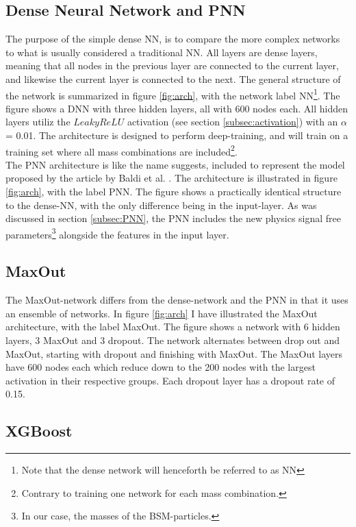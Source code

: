 \subsection*{Dense Neural Network and PNN}\label{subsec:PNNArch}
The purpose of the simple dense \ac{NN}, is to compare the more complex networks to what is usually considered a traditional \ac{NN}.
All layers are dense layers, meaning that all nodes in the previous layer are connected to the current layer, and likewise
the current layer is connected to the next. The general structure of the network is summarized in figure \ref{fig:arch}, with 
the network label \ac{NN}\footnote{Note that the dense network will henceforth be referred to as \ac{NN}}. The figure shows a \ac{DNN} with 
three hidden layers, all with 600 nodes each. All hidden layers utiliz the $LeakyReLU$ activation (see section \ref{subsec:activation})
with an $\alpha$ = 0.01. The architecture is designed to perform deep-training, and will train on a training set where all mass combinations 
are included\footnote{Contrary to training one network for each mass combination.}. 
\\
The \ac{PNN} architecture is like the name suggests, included to represent the model proposed by the article by Baldi et al. \cite{PNN}.
The architecture is illustrated in figure \ref{fig:arch}, with the label PNN. The figure shows a practically identical 
structure to the dense-\ac{NN}, with the only difference being in the input-layer. As was discussed in section \ref{subsec:PNN},
the \ac{PNN} includes the new physics signal free parameters\footnote{In our case, the masses of the \ac{BSM}-particles.} alongside the features
in the input layer.
\subsection*{MaxOut}
The MaxOut-network differs from the dense-network and the \ac{PNN} in that it uses an ensemble of networks. In figure \ref{fig:arch}
I have illustrated the MaxOut architecture, with the label MaxOut. The figure shows a network with 6 hidden layers, 3 MaxOut and 3 dropout.
The network alternates between drop out and MaxOut, starting with dropout and finishing with MaxOut. The MaxOut layers have 600 nodes each 
which reduce down to the 200 nodes with the largest activation in their respective groups. Each dropout layer has a dropout rate of 0.15.

\subsection*{XGBoost}\label{subsec:XGBoost}
 

